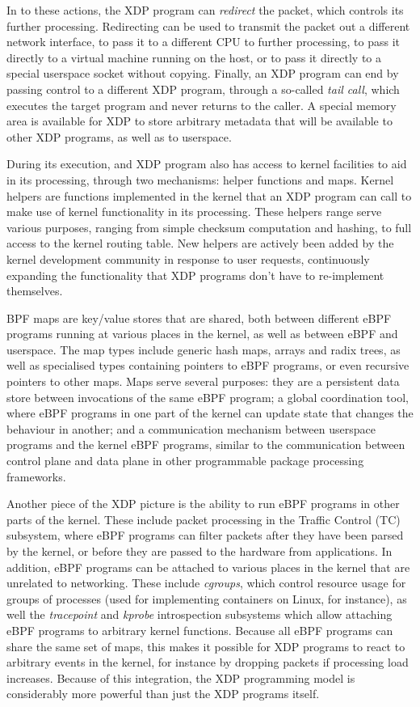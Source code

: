 \documentclass[10pt]{sig-alternate-05-2015}
\begin{document}
In to these actions, the XDP program can \emph{redirect} the packet, which controls
its further processing. Redirecting can be used to transmit the packet out a
different network interface, to pass it to a different CPU to further
processing, to pass it directly to a virtual machine running on the host, or to
pass it directly to a special userspace socket without copying. Finally, an XDP
program can end by passing control to a different XDP program, through a
so-called \emph{tail call}, which executes the target program and never returns to
the caller. A special memory area is available for XDP to store arbitrary
metadata that will be available to other XDP programs, as well as to userspace.

During its execution, and XDP program also has access to kernel facilities to
aid in its processing, through two mechanisms: helper functions and maps. Kernel
helpers are functions implemented in the kernel that an XDP program can call to
make use of kernel functionality in its processing. These helpers range serve
various purposes, ranging from simple checksum computation and hashing, to full
access to the kernel routing table. New helpers are actively been added by the
kernel development community in response to user requests, continuously
expanding the functionality that XDP programs don't have to re-implement
themselves.

BPF maps are key/value stores that are shared, both between different eBPF
programs running at various places in the kernel, as well as between eBPF and
userspace. The map types include generic hash maps, arrays and radix trees, as
well as specialised types containing pointers to eBPF programs, or even
recursive pointers to other maps. Maps serve several purposes: they are a
persistent data store between invocations of the same eBPF program; a global
coordination tool, where eBPF programs in one part of the kernel can update
state that changes the behaviour in another; and a communication mechanism
between userspace programs and the kernel eBPF programs, similar to the
communication between control plane and data plane in other programmable package
processing frameworks.

Another piece of the XDP picture is the ability to run eBPF programs in other
parts of the kernel. These include packet processing in the Traffic Control (TC)
subsystem, where eBPF programs can filter packets after they have been parsed by
the kernel, or before they are passed to the hardware from applications. In
addition, eBPF programs can be attached to various places in the kernel that are
unrelated to networking. These include \emph{cgroups}, which control resource usage
for groups of processes (used for implementing containers on Linux, for
instance), as well the \emph{tracepoint} and \emph{kprobe} introspection subsystems which
allow attaching eBPF programs to arbitrary kernel functions. Because all eBPF
programs can share the same set of maps, this makes it possible for XDP programs
to react to arbitrary events in the kernel, for instance by dropping packets if
processing load increases. Because of this integration, the XDP programming
model is considerably more powerful than just the XDP programs itself.
\end{document}
